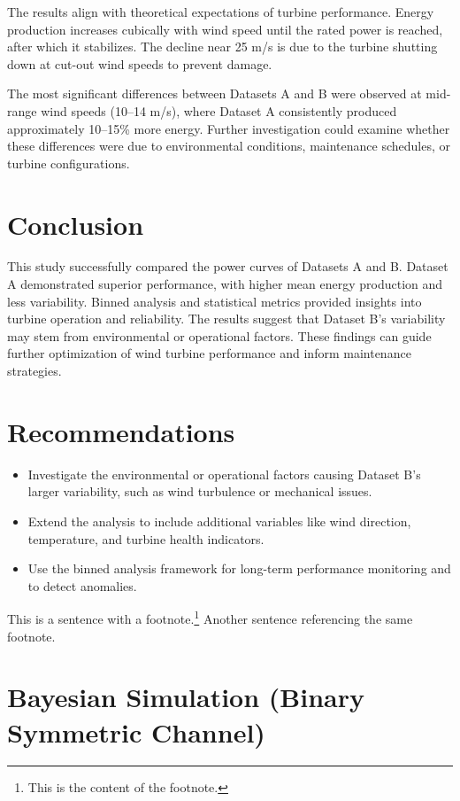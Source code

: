 \documentclass[a4paper,11pt]{article}
\begin{document}
The results align with theoretical expectations of turbine performance. Energy production increases cubically with wind speed until the rated power is reached, after which it stabilizes. The decline near 25 m/s is due to the turbine shutting down at cut-out wind speeds to prevent damage.

The most significant differences between Datasets A and B were observed at mid-range wind speeds (10--14 m/s), where Dataset A consistently produced approximately 10--15\% more energy. Further investigation could examine whether these differences were due to environmental conditions, maintenance schedules, or turbine configurations.

\section*{Conclusion}
This study successfully compared the power curves of Datasets A and B. Dataset A demonstrated superior performance, with higher mean energy production and less variability. Binned analysis and statistical metrics provided insights into turbine operation and reliability. The results suggest that Dataset B's variability may stem from environmental or operational factors. These findings can guide further optimization of wind turbine performance and inform maintenance strategies.

\section*{Recommendations}
\begin{itemize}
    \item Investigate the environmental or operational factors causing Dataset B's larger variability, such as wind turbulence or mechanical issues.
    \item Extend the analysis to include additional variables like wind direction, temperature, and turbine health indicators.
    \item Use the binned analysis framework for long-term performance monitoring and to detect anomalies.
\end{itemize}
 This is a sentence with a footnote.\footnote{This is the content of the footnote.}
Another sentence referencing the same footnote\footnotemark.

 
 

\newpage

\section{Bayesian Simulation (Binary Symmetric Channel)}
\end{document}
